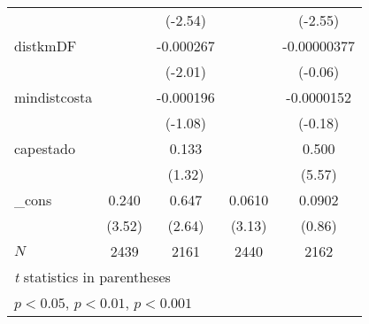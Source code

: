 {\begin{tabular}{l*{4}{c}}
            &                     &     (-2.54)         &                     &     (-2.55)         \\
[1em]
distkmDF    &                     &   -0.000267         &                     & -0.00000377         \\
            &                     &     (-2.01)         &                     &     (-0.06)         \\
[1em]
mindistcosta&                     &   -0.000196         &                     &  -0.0000152         \\
            &                     &     (-1.08)         &                     &     (-0.18)         \\
[1em]
capestado   &                     &       0.133         &                     &       0.500\sym{***}\\
            &                     &      (1.32)         &                     &      (5.57)         \\
[1em]
\_cons      &       0.240\sym{**} &       0.647\sym{*}  &      0.0610\sym{**} &      0.0902         \\
            &      (3.52)         &      (2.64)         &      (3.13)         &      (0.86)         \\
\hline
\(N\)       &        2439         &        2161         &        2440         &        2162         \\
\hline\hline
\multicolumn{5}{l}{\footnotesize \textit{t} statistics in parentheses}\\
\multicolumn{5}{l}{\footnotesize \sym{*} \(p<0.05\), \sym{**} \(p<0.01\), \sym{***} \(p<0.001\)}\\
\end{tabular}
}
